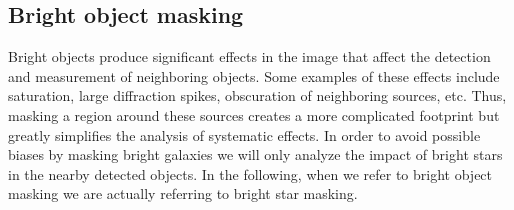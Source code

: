 \documentclass[twocolumn]{aastex62}
\begin{document}
\subsection{Bright object masking}

Bright objects produce significant effects in the image that affect the detection and measurement of neighboring objects. Some examples of these effects include saturation, large diffraction spikes, obscuration of neighboring sources, etc. Thus, masking a region around these sources creates a more complicated footprint but greatly simplifies the analysis of systematic effects. In order to avoid possible biases by masking bright galaxies we will only analyze the impact of bright stars in the nearby detected objects. In the following, when we refer to bright object masking we are actually referring to bright star masking.
\end{document}
